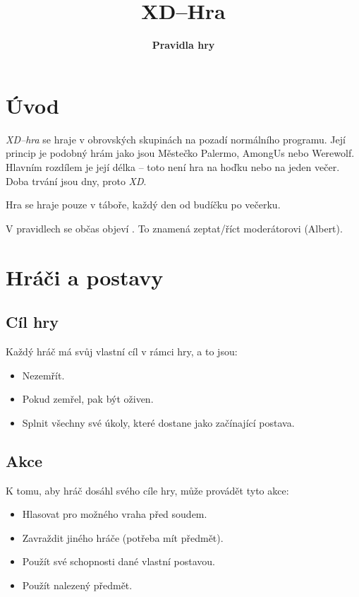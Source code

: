 \documentclass[11pt]{article} %
\title{
    \tengwarannatarbolditalic \tengmag{4} \Tcalma \Tlefthook \Tando  \Tanga \TTthreedots \Tmalta \TTacute \\
    \textbf{XD--Hra} 
}
\author{
    \textbf{Pravidla hry} \\
    \tengwarannataritalic \tengmag{3.5} \Tanga \TTthreedots \Tmalta \TTacute  \Ts \Troomen \TTleftcurl \Tlambe \TTacute \Tsilme
}
\date{} %
\newcommand{\albert}{\Nursey[][yellow][blue][red]}
\begin{document}
\maketitle
\tableofcontents

\newpage

\section{Úvod}

\textit{XD--hra} se hraje v obrovských skupinách na pozadí normálního programu.
Její princip je podobný hrám jako jsou Městečko Palermo, AmongUs nebo Werewolf.
Hlavním rozdílem je její délka -- toto není hra na hoďku nebo na jeden večer.
Doba trvání jsou dny, proto \textit{XD}.

Hra se hraje pouze v táboře, každý den od budíčku po večerku.

V pravidlech se občas objeví \albert. To znamená zeptat/říct moderátorovi (Albert).

\section{Hráči a postavy}

\subsection{Cíl hry}

Každý hráč má svůj vlastní cíl v rámci hry, a to jsou:
\begin{itemize}
    \item Nezemřít.
    \item Pokud zemřel, pak být oživen.
    \item Splnit všechny své úkoly, které dostane jako začínající postava.
\end{itemize}

\subsection{Akce}

K tomu, aby hráč dosáhl svého cíle hry, může provádět tyto akce:
\begin{itemize}
    \item Hlasovat pro možného vraha před soudem.
    \item Zavraždit jiného hráče (potřeba mít předmět).
    \item Použít své schopnosti dané vlastní postavou.
    \item Použít nalezený předmět.
\end{itemize}
\end{document}
